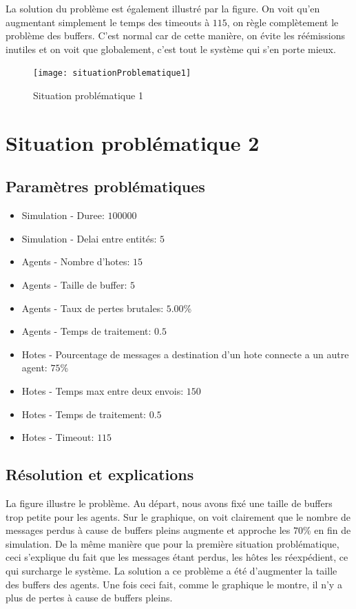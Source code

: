 \documentclass[a4paper,11pt]{article}
\begin{document}
La solution du problème est également illustré par la figure. On voit qu'en augmentant simplement le temps des timeouts à $115$, on règle complètement le problème des buffers. C'est normal car de cette manière, on évite les réémissions inutiles et on voit que globalement, c'est tout le système qui s'en porte mieux.

\begin{figure}[h!t]
  \centering
    \texttt{[image: situationProblematique1]}
  \caption{Situation problématique 1}
  \label{fig:situationproblematique1}
\end{figure}






\section{Situation problématique 2}
\subsection{Paramètres problématiques}
\begin{itemize}
 \item Simulation - Duree: $100000$
 \item Simulation - Delai entre entités: $5$
 \item Agents - Nombre d'hotes: $15$
 \item Agents - Taille de buffer: \textbf{$5$}
 \item Agents - Taux de pertes brutales: $5.00$\%
 \item Agents - Temps de traitement: $0.5$
 \item Hotes - Pourcentage de messages a destination d'un hote connecte a un autre agent: $75$\%
 \item Hotes - Temps max entre deux envois: $150$
 \item Hotes - Temps de traitement: $0.5$
 \item Hotes - Timeout: $115$
\end{itemize}

\subsection{Résolution et explications}
La figure  illustre le problème. Au départ, nous avons fixé une taille de buffers trop petite pour les agents. Sur le graphique, on voit clairement que le nombre de messages perdus à cause de buffers pleins augmente et approche les $70$\% en fin de simulation. De la même manière que pour la première situation problématique, ceci s'explique du fait que les messages étant perdus, les hôtes les réexpédient, ce qui surcharge le système. La solution a ce problème a été d'augmenter la taille des buffers des agents. Une fois ceci fait, comme le graphique le montre, il n'y a plus de pertes à cause de buffers pleins.
\end{document}
